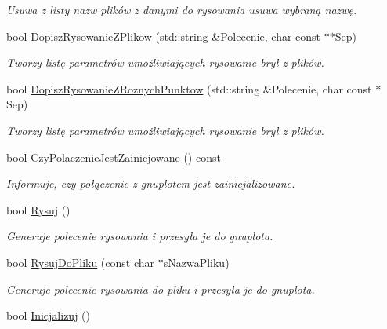 \begin{DoxyCompactItemize}
\begin{DoxyCompactList}\small\item\em Usuwa z listy nazw plików z danymi do rysowania usuwa wybraną nazwę. \end{DoxyCompactList}\item 
bool \mbox{\hyperlink{class_pz_g_1_1_lacze_do_g_n_u_plota_ad3d7607946b82aa941d786dcd086d27e}{Dopisz\+Rysowanie\+Z\+Plikow}} (std\+::string \&Polecenie, char const $\ast$$\ast$Sep)
\begin{DoxyCompactList}\small\item\em Tworzy listę parametrów umożliwiających rysowanie brył z plików. \end{DoxyCompactList}\item 
bool \mbox{\hyperlink{class_pz_g_1_1_lacze_do_g_n_u_plota_aee10e48fe1b9fba6e2897b4ccfa27aef}{Dopisz\+Rysowanie\+Z\+Roznych\+Punktow}} (std\+::string \&Polecenie, char const $\ast$Sep)
\begin{DoxyCompactList}\small\item\em Tworzy listę parametrów umożliwiających rysowanie brył z plików. \end{DoxyCompactList}\item 
bool \mbox{\hyperlink{class_pz_g_1_1_lacze_do_g_n_u_plota_af8be8aeb3b1b524fab67d4411cba5b9e}{Czy\+Polaczenie\+Jest\+Zainicjowane}} () const
\begin{DoxyCompactList}\small\item\em Informuje, czy połączenie z {\itshape gnuplot\textquotesingle{}em} jest zainicjalizowane. \end{DoxyCompactList}\item 
bool \mbox{\hyperlink{class_pz_g_1_1_lacze_do_g_n_u_plota_a065f5b8402737cc62b0ad4f66d028335}{Rysuj}} ()
\begin{DoxyCompactList}\small\item\em Generuje polecenie rysowania i przesyła je do gnuplota. \end{DoxyCompactList}\item 
bool \mbox{\hyperlink{class_pz_g_1_1_lacze_do_g_n_u_plota_aacb7ae45d283c741fb330f27b132e1a3}{Rysuj\+Do\+Pliku}} (const char $\ast$s\+Nazwa\+Pliku)
\begin{DoxyCompactList}\small\item\em Generuje polecenie rysowania do pliku i przesyła je do gnuplota. \end{DoxyCompactList}\item 
bool \mbox{\hyperlink{class_pz_g_1_1_lacze_do_g_n_u_plota_a200ce6bdb980c314a9eafe49e8f2dd5e}{Inicjalizuj}} ()
$$
\end{DoxyCompactItemize}
